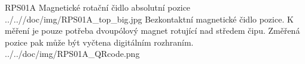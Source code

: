 \uvod
{RPS01A}
{Magnetické rotační čidlo absolutní pozice}
{}
{../..//doc/img/RPS01A_top_big.jpg}
{Bezkontaktní magnetické čidlo pozice. K měření je pouze potřeba dvoupólový magnet rotující nad středem čipu. Změřená pozice pak může být vyčtena digitálním rozhraním.}
{ }
{../../doc/img/RPS01A_QRcode.png}